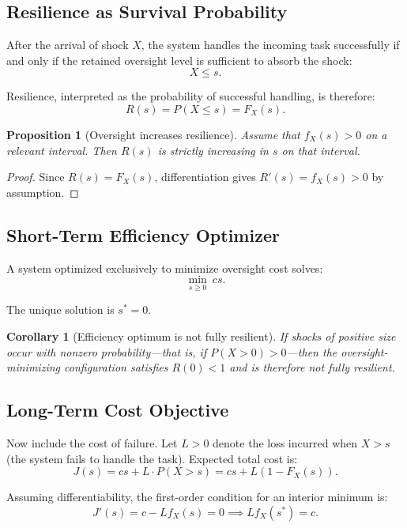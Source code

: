 \documentclass[11pt,a4paper]{article}
\theoremstyle{definition}
\theoremstyle{plain}
\newtheorem{proposition}{Proposition}
\newtheorem{corollary}{Corollary}
\theoremstyle{remark}
\begin{document}
\subsection{Resilience as Survival Probability}

After the arrival of shock $X$, the system handles the incoming task successfully if and only if the retained oversight level is sufficient to absorb the shock:
\[
X \leq s.
\]

Resilience, interpreted as the probability of successful handling, is therefore:
\[
R(s) = P(X \leq s) = F_X(s).
\]

\begin{proposition}[Oversight increases resilience]\label{prop:monotone}
Assume that $f_X(s) > 0$ on a relevant interval. Then $R(s)$ is strictly increasing in $s$ on that interval.
\end{proposition}

\begin{proof}
Since $R(s) = F_X(s)$, differentiation gives $R'(s) = f_X(s) > 0$ by assumption.
\end{proof}

\subsection{Short-Term Efficiency Optimizer}

A system optimized exclusively to minimize oversight cost solves:
\[
\min_{s \geq 0} \ cs.
\]

The unique solution is $s^* = 0$.

\begin{corollary}[Efficiency optimum is not fully resilient]\label{cor:brittle}
If shocks of positive size occur with nonzero probability---that is, if $P(X > 0) > 0$---then the oversight-minimizing configuration satisfies $R(0) < 1$ and is therefore not fully resilient.
\end{corollary}

\subsection{Long-Term Cost Objective}

Now include the cost of failure. Let $L > 0$ denote the loss incurred when $X > s$ (the system fails to handle the task). Expected total cost is:
\[
J(s) = cs + L \cdot P(X > s) = cs + L(1 - F_X(s)).
\]

Assuming differentiability, the first-order condition for an interior minimum is:
\[
J'(s) = c - L f_X(s) = 0 \implies L f_X(s^*) = c.
\]
\end{document}
